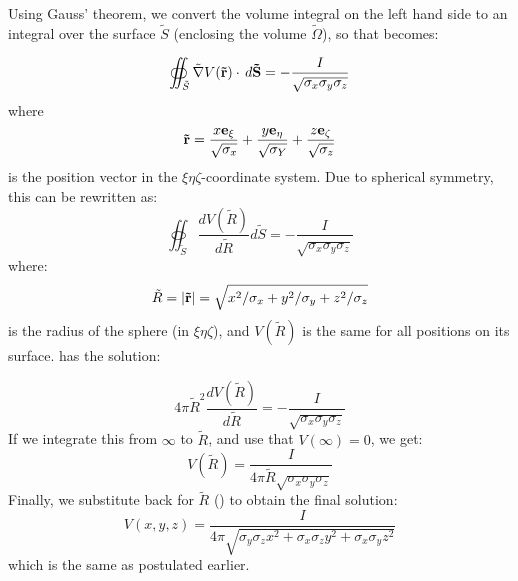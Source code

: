 Using Gauss' theorem, we convert the volume integral on the left hand side
to an integral over the surface $\tilde{S}$ (enclosing the volume $\tilde{\Omega}$), 
so that  becomes:

\begin{equation}
\oiint_{\tilde{S}} \tilde{\nabla}V({\bf \tilde{r}}) \cdot \, d{\bf \tilde{S}}  = - \frac{I}{\sqrt{\sigma_x\sigma_y\sigma_z}}
\label{eq:AppAniso:berit1}
\end{equation}
where 
\begin{equation}
{\bf \tilde{r}} = \frac{x{\bf e}_\xi}{\sqrt{\sigma_{x}}} + \frac{y{\bf e}_\eta}{\sqrt{\sigma_{Y}}}+\frac{z{\bf e}_\zeta}{\sqrt{\sigma_{z}}}
\end{equation}
is the position vector in the $\xi\eta\zeta$-coordinate system. Due to spherical symmetry, this can be rewritten as:
\begin{equation}
\oiint_{\tilde{S}} \frac{d V(\tilde{R})}{d\tilde{R}} d{\tilde{S}}  = - \frac{I}{\sqrt{\sigma_x\sigma_y\sigma_z}}
\label{eq:AppAniso:berit1ogenhalv}
\end{equation}
where:
\begin{equation}
\tilde{R} = |{\bf \tilde{r}}| = \sqrt{x^2/\sigma_x + y^2/\sigma_y + z^2/\sigma_z}
\label{eq:AppAniso:R}
\end{equation}
is the radius of the sphere (in $\xi\eta\zeta$), and $V(\tilde{R})$ is the same for all positions on its surface. 
 has the solution:

\begin{equation}
4\pi \tilde{R}^2 \frac{d V(\tilde{R})}{d\tilde{R}} = - \frac{I}{\sqrt{\sigma_x\sigma_y\sigma_z}}
\label{eq:AppAniso:berit2}
\end{equation}
If we integrate this from $\infty$ to $\tilde{R}$, and use that $V(\infty) = 0$, we get:
\begin{equation}
V(\tilde{R}) = \frac{I}{4\pi \tilde{R}\sqrt{\sigma_x\sigma_y\sigma_z}}
\label{eq:AppAniso:berit3}
\end{equation}
Finally, we substitute back for $\tilde{R}$ () to obtain the final solution: 
\begin{equation}
V(x,y,z) = \frac{I}{4 \pi \sqrt{\sigma_y\sigma_z x^2 + \sigma_x\sigma_z y^2 + \sigma_x\sigma_y z^2}}
\label{eq:VC:berit3}
\end{equation}
which is the same as  postulated earlier. 
